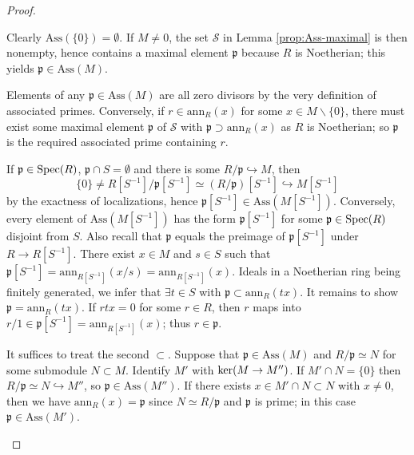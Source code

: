 \begin{proof}
	\begin{asparaenum}[(i)]
	\item Clearly $\text{Ass}(\{0\}) = \emptyset$. If $M \neq 0$, the set $\mathcal{S}$ in Lemma \ref{prop:Ass-maximal} is then nonempty, hence contains a maximal element $\mathfrak{p}$ because $R$ is Noetherian; this yields $\mathfrak{p} \in \text{Ass}(M)$.
	
	\item Elements of any $\mathfrak{p} \in \text{Ass}(M)$ are all zero divisors by the very definition of associated primes. Conversely, if $r \in \text{ann}_R(x)$ for some $x \in M \smallsetminus \{0\}$, there must exist some maximal element $\mathfrak{p}$ of $\mathcal{S}$ with $\mathfrak{p} \supset \text{ann}_R(x)$ as $R$ is Noetherian; so $\mathfrak{p}$ is the required associated prime containing $r$.
	
	\item If $\mathfrak{p} \in \operatorname{Spec}(R)$, $\mathfrak{p} \cap S = \emptyset$ and there is some $R/\mathfrak{p} \hookrightarrow M$, then
	\[ \{0\} \neq R[S^{-1}]/\mathfrak{p}[S^{-1}] \simeq (R/\mathfrak{p})[S^{-1}] \hookrightarrow M[S^{-1}] \]
	by the exactness of localizations, hence $\mathfrak{p}[S^{-1}] \in \text{Ass}(M[S^{-1}])$. Conversely, every element of $\text{Ass}(M[S^{-1}])$ has the form $\mathfrak{p}[S^{-1}]$ for some $\mathfrak{p} \in \operatorname{Spec}(R)$ disjoint from $S$. Also recall that $\mathfrak{p}$ equals the preimage of $\mathfrak{p}[S^{-1}]$ under $R \to R[S^{-1}]$. There exist $x \in M$ and $s \in S$ such that $\mathfrak{p}[S^{-1}] = \text{ann}_{R[S^{-1}]}(x/s) = \text{ann}_{R[S^{-1}]}(x)$. Ideals in a Noetherian ring being finitely generated, we infer that $\exists t \in S$ with $\mathfrak{p} \subset \text{ann}_R(tx)$. It remains to show $\mathfrak{p} = \text{ann}_R(tx)$. If $rtx=0$ for some $r \in R$, then $r$ maps into $r/1 \in \mathfrak{p}[S^{-1}] = \text{ann}_{R[S^{-1}]}(x)$; thus $r \in \mathfrak{p}$.

	\item It suffices to treat the second $\subset$. Suppose that $\mathfrak{p} \in \text{Ass}(M)$ and $R/\mathfrak{p} \simeq N$ for some submodule $N \subset M$. Identify $M'$ with $\operatorname{ker}(M \to M'')$. If $M' \cap N = \{0\}$ then $R/\mathfrak{p} \simeq N \hookrightarrow M''$, so $\mathfrak{p} \in \text{Ass}(M'')$. If there exists $x \in M' \cap N \subset N$ with $x \neq 0$, then we have $\text{ann}_R(x) = \mathfrak{p}$ since $N \simeq R/\mathfrak{p}$ and $\mathfrak{p}$ is prime; in this case $\mathfrak{p} \in \text{Ass}(M')$.
	\end{asparaenum}
\end{proof}

